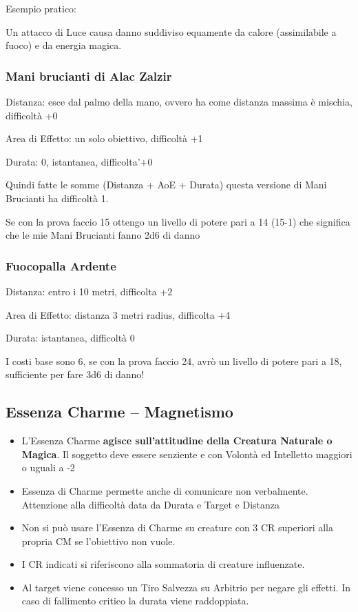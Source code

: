 \documentclass[a4paper,11pt,twoside,openany]{book}
\begin{document}
Esempio pratico:

Un attacco di Luce causa danno suddiviso equamente da calore (assimilabile a fuoco) e da energia magica.

\subsubsection{Mani brucianti di Alac Zalzir}

Distanza: esce dal palmo della mano, ovvero ha come distanza massima è mischia, difficoltà +0

Area di Effetto: un solo obiettivo, difficoltà +1

Durata: 0, istantanea, difficolta'+0

Quindi fatte le somme (Distanza + AoE + Durata) questa versione di Mani Brucianti ha difficoltà 1.

Se con la prova faccio 15 ottengo un livello di potere pari a 14 (15-1) che significa che le mie Mani Brucianti fanno 2d6 di danno

\subsubsection{Fuocopalla Ardente}

Distanza: entro i 10 metri, difficolta +2

Area di Effetto: distanza 3 metri radius, difficolta +4

Durata: istantanea, difficoltà 0

I costi base sono 6, se con la prova faccio 24, avrò un livello di potere pari a 18, sufficiente per fare 3d6 di danno!

\pagebreak

\subsection{Essenza Charme -- Magnetismo}

\label{essenza-charme---magnetismo}

\begin{itemize}
\item 
L'Essenza Charme \textbf{agisce sull'attitudine della Creatura Naturale o Magica}. Il soggetto deve essere senziente e con Volontà ed Intelletto maggiori o uguali a -2 
\item
Essenza di Charme permette anche di comunicare non verbalmente. Attenzione alla difficoltà data da Durata e Target e Distanza 
\item
Non si può usare l'Essenza di Charme su creature con 3 CR superiori alla propria CM se l'obiettivo non vuole. 
\item
I CR indicati si riferiscono alla sommatoria di creature influenzate. 
\item
Al target viene concesso un Tiro Salvezza su Arbitrio per negare gli effetti. In caso di fallimento critico la durata viene raddoppiata. 
\end{itemize}
\end{document}
